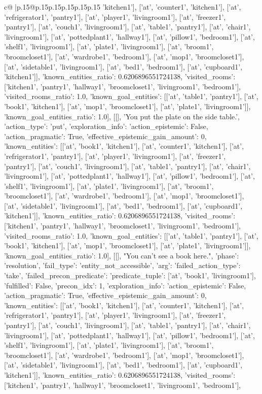 \documentclass{article}
\begin{document}
{\begin{supertabular}{c@{$\;$}|p{.15\linewidth}@{}p{.15\linewidth}p{.15\linewidth}p{.15\linewidth}p{.15\linewidth}p{.15\linewidth}}
{{{'kitchen1'], ['at', 'counter1', 'kitchen1'], ['at', 'refrigerator1', 'pantry1'], ['at', 'player1', 'livingroom1'], ['at', 'freezer1', 'pantry1'], ['at', 'couch1', 'livingroom1'], ['at', 'table1', 'pantry1'], ['at', 'chair1', 'livingroom1'], ['at', 'pottedplant1', 'hallway1'], ['at', 'pillow1', 'bedroom1'], ['at', 'shelf1', 'livingroom1'], ['at', 'plate1', 'livingroom1'], ['at', 'broom1', 'broomcloset1'], ['at', 'wardrobe1', 'bedroom1'], ['at', 'mop1', 'broomcloset1'], ['at', 'sidetable1', 'livingroom1'], ['at', 'bed1', 'bedroom1'], ['at', 'cupboard1', 'kitchen1']], 'known_entities_ratio': 0.6206896551724138, 'visited_rooms': ['kitchen1', 'pantry1', 'hallway1', 'broomcloset1', 'livingroom1', 'bedroom1'], 'visited_rooms_ratio': 1.0, 'known_goal_entities': [['at', 'table1', 'pantry1'], ['at', 'book1', 'kitchen1'], ['at', 'mop1', 'broomcloset1'], ['at', 'plate1', 'livingroom1']], 'known_goal_entities_ratio': 1.0}}], [[], 'You put the plate on the side table.', {'action_type': 'put', 'exploration_info': {'action_epistemic': False, 'action_pragmatic': True, 'effective_epistemic_gain_amount': 0, 'known_entities': [['at', 'book1', 'kitchen1'], ['at', 'counter1', 'kitchen1'], ['at', 'refrigerator1', 'pantry1'], ['at', 'player1', 'livingroom1'], ['at', 'freezer1', 'pantry1'], ['at', 'couch1', 'livingroom1'], ['at', 'table1', 'pantry1'], ['at', 'chair1', 'livingroom1'], ['at', 'pottedplant1', 'hallway1'], ['at', 'pillow1', 'bedroom1'], ['at', 'shelf1', 'livingroom1'], ['at', 'plate1', 'livingroom1'], ['at', 'broom1', 'broomcloset1'], ['at', 'wardrobe1', 'bedroom1'], ['at', 'mop1', 'broomcloset1'], ['at', 'sidetable1', 'livingroom1'], ['at', 'bed1', 'bedroom1'], ['at', 'cupboard1', 'kitchen1']], 'known_entities_ratio': 0.6206896551724138, 'visited_rooms': ['kitchen1', 'pantry1', 'hallway1', 'broomcloset1', 'livingroom1', 'bedroom1'], 'visited_rooms_ratio': 1.0, 'known_goal_entities': [['at', 'table1', 'pantry1'], ['at', 'book1', 'kitchen1'], ['at', 'mop1', 'broomcloset1'], ['at', 'plate1', 'livingroom1']], 'known_goal_entities_ratio': 1.0}}], [[], "You can't see a book here.", {'phase': 'resolution', 'fail_type': 'entity_not_accessible', 'arg': {'failed_action_type': 'take', 'failed_precon_predicate': {'predicate_tuple': ['at', 'book1', 'livingroom1'], 'fulfilled': False, 'precon_idx': 1}}, 'exploration_info': {'action_epistemic': False, 'action_pragmatic': True, 'effective_epistemic_gain_amount': 0, 'known_entities': [['at', 'book1', 'kitchen1'], ['at', 'counter1', 'kitchen1'], ['at', 'refrigerator1', 'pantry1'], ['at', 'player1', 'livingroom1'], ['at', 'freezer1', 'pantry1'], ['at', 'couch1', 'livingroom1'], ['at', 'table1', 'pantry1'], ['at', 'chair1', 'livingroom1'], ['at', 'pottedplant1', 'hallway1'], ['at', 'pillow1', 'bedroom1'], ['at', 'shelf1', 'livingroom1'], ['at', 'plate1', 'livingroom1'], ['at', 'broom1', 'broomcloset1'], ['at', 'wardrobe1', 'bedroom1'], ['at', 'mop1', 'broomcloset1'], ['at', 'sidetable1', 'livingroom1'], ['at', 'bed1', 'bedroom1'], ['at', 'cupboard1', 'kitchen1']], 'known_entities_ratio': 0.6206896551724138, 'visited_rooms': ['kitchen1', 'pantry1', 'hallway1', 'broomcloset1', 'livingroom1', 'bedroom1'], }}}
\end{supertabular}}
\end{document}
